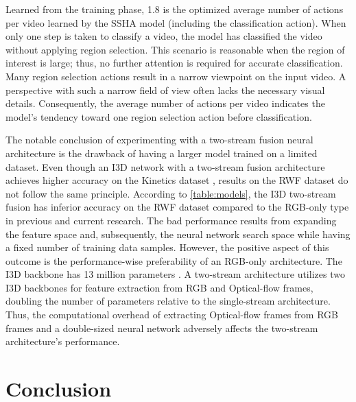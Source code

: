 \documentclass[review]{elsarticle}
\begin{document}
Learned from the training phase, 1.8 is the optimized average number of actions per video learned by the SSHA model (including the classification action). When only one step is taken to classify a video, the model has classified the video without applying region selection. This scenario is reasonable when the region of interest is large; thus, no further attention is required for accurate classification. Many region selection actions result in a narrow viewpoint on the input video. A perspective with such a narrow field of view often lacks the necessary visual details. Consequently, the average number of actions per video indicates the model’s tendency toward one region selection action before classification.

The notable conclusion of experimenting with a two-stream fusion neural architecture is the drawback of having a larger model trained on a limited dataset. Even though an I3D network with a two-stream fusion architecture achieves higher accuracy on the Kinetics dataset \citep{carreira2017quo}, results on the RWF dataset do not follow the same principle. According to \autoref{table:models}, the I3D two-stream fusion has inferior accuracy on the RWF dataset compared to the RGB-only type in previous and current research. The bad performance results from expanding the feature space and, subsequently, the neural network search space while having a fixed number of training data samples. However, the positive aspect of this outcome is the performance-wise preferability of an RGB-only architecture. The I3D backbone has 13 million parameters \citep{carreira2017quo}. A two-stream architecture utilizes two I3D backbones for feature extraction from RGB and Optical-flow frames, doubling the number of parameters relative to the single-stream architecture. Thus, the computational overhead of extracting Optical-flow frames from RGB frames and a double-sized neural network adversely affects the two-stream architecture’s performance.


\section{Conclusion}
\label{Conclusion and future work}
\end{document}
